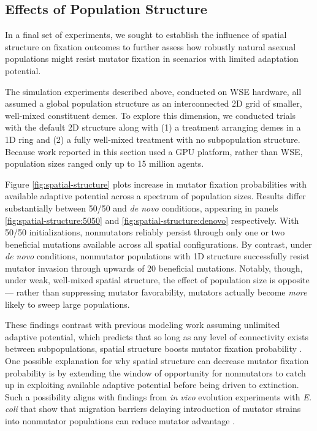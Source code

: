 \subsection{Effects of Population Structure}
\label{sec:population-structure}

In a final set of experiments, we sought to establish the influence of spatial structure on fixation outcomes to further assess how robustly natural asexual populations might resist mutator fixation in scenarios with limited adaptation potential.

The simulation experiments described above, conducted on WSE hardware, all assumed a global population structure as an interconnected 2D grid of smaller, well-mixed constituent demes.
To explore this dimension, we conducted trials with the default 2D structure along with (1) a treatment arranging demes in a 1D ring and (2) a fully well-mixed treatment with no subpopulation structure.
Because work reported in this section used a GPU platform, rather than WSE, population sizes ranged only up to 15 million agents.



Figure \ref{fig:spatial-structure} plots increase in mutator fixation probabilities with available adaptive potential across a spectrum of population sizes.
Results differ substantially between 50/50 and \textit{de novo} conditions, appearing in panels \ref{fig:spatial-structure:5050} and \ref{fig:spatial-structure:denovo} respectively.
With 50/50 initializations, nonmutators reliably persist through only one or two beneficial mutations available across all spatial configurations.
By contrast, under \textit{de novo} conditions, nonmutator populations with 1D structure successfully resist mutator invasion through upwards of 20 beneficial mutations.
Notably, though, under weak, well-mixed spatial structure, the effect of population size is opposite --- rather than suppressing mutator favorability, mutators actually become \textit{more} likely to sweep large populations.

These findings contrast with previous modeling work assuming unlimited adaptive potential, which predicts that so long as any level of connectivity exists between subpopulations, spatial structure boosts mutator fixation probability \citep{raynes2019migration}.
One possible explanation for why spatial structure can decrease mutator fixation probability is by extending the window of opportunity for nonmutators to catch up in exploiting available adaptive potential before being driven to extinction.
Such a possibility aligns with findings from \textit{in vivo} evolution experiments with \textit{E. coli} that show that migration barriers delaying introduction of mutator strains into nonmutator populations can reduce mutator advantage \citep{lechat2006escherichia}.
